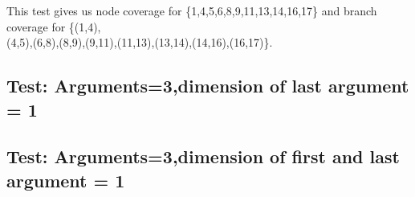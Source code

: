 This test gives us node coverage for \{1,4,5,6,8,9,11,13,14,16,17\} and branch coverage for \{(1,4),
\\
(4,5),(6,8),(8,9),(9,11),(11,13),(13,14),(14,16),(16,17)\}.




\subsection{Test: Arguments=3,dimension of last argument = 1}


\subsection{Test: Arguments=3,dimension of first and last argument = 1}
